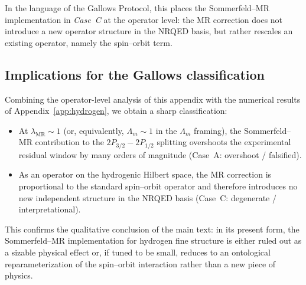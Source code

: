 \documentclass[11pt,a4paper]{article}
\newcommand{\LambdaM}{\Lambda_{m}}
\newcommand{\lamMR}{\lambda_{\mathrm{MR}}}
\begin{document}
In the language of the Gallows Protocol, this places the Sommerfeld--MR
implementation in \emph{Case~C} at the operator level: the MR correction
does not introduce a new operator structure in the NRQED basis, but
rather rescales an existing operator, namely the spin--orbit term.

\subsection{Implications for the Gallows classification}

Combining the operator-level analysis of this appendix with the
numerical results of Appendix~\ref{app:hydrogen}, we obtain a sharp
classification:
\begin{itemize}
  \item At $\lamMR \sim 1$ (or, equivalently, $\LambdaM \sim 1$ in the
    $\LambdaM$ framing), the Sommerfeld--MR contribution to the
    $2P_{3/2} - 2P_{1/2}$ splitting overshoots the experimental residual
    window by many orders of magnitude (Case~A: overshoot / falsified).
  \item As an operator on the hydrogenic Hilbert space, the MR
    correction is proportional to the standard spin--orbit operator and
    therefore introduces no new independent structure in the NRQED
    basis (Case~C: degenerate / interpretational).
\end{itemize}

This confirms the qualitative conclusion of the main text: in its
present form, the Sommerfeld--MR implementation for hydrogen fine
structure is either ruled out as a sizable physical effect or,
if tuned to be small, reduces to an ontological reparameterization of
the spin--orbit interaction rather than a new piece of physics.
\end{document}
